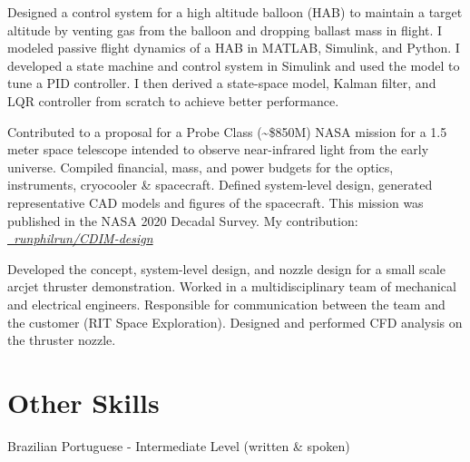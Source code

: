 \documentclass[10pt,final,sans]{resume}
\begin{document}
Designed a control system for a high altitude balloon (HAB)
to maintain a target altitude by venting gas from the balloon and dropping
ballast mass in flight. I modeled passive flight dynamics of a HAB in MATLAB,
Simulink, and Python. I developed a state machine and control system in
Simulink and used the model to tune a PID controller. I then derived a
state-space model, Kalman filter, and LQR controller from scratch to achieve
better performance.

Contributed to a proposal for a Probe Class (\textasciitilde\$850M) NASA mission
for a 1.5 meter space telescope intended to observe near-infrared light from the
early universe. Compiled financial, mass, and power budgets for the optics,
instruments, cryocooler \& spacecraft. Defined system-level design, generated
representative CAD models and figures of the spacecraft. This mission was
published in the NASA 2020 Decadal Survey. My contribution: \href{https://github.com/runphilrun/CDIM-design/blob/master/cdim_design.pdf}{\it \faGithub\ runphilrun/CDIM-design}

Developed the concept, system-level design, and nozzle design for a small scale
arcjet thruster demonstration. Worked in a multidisciplinary team of mechanical
and electrical engineers. Responsible for communication between the team and the
customer (RIT Space Exploration). Designed and performed CFD analysis on the
thruster nozzle.

\section{Other Skills}
Brazilian Portuguese - Intermediate Level (written \& spoken)
\end{document}
